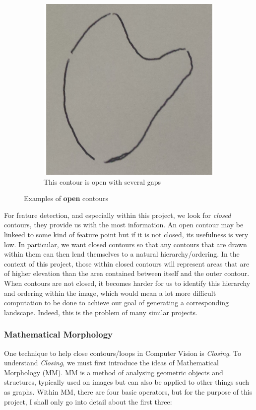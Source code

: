\documentclass[11pt]{report}
\begin{document}
\begin{figure}[!ht]
\begin{subfigure}[t]{.3\textwidth}
		\centering
		\includegraphics[scale=0.3]{pics/openloop3.png}
		\caption{This contour is open with several gaps}
	\end{subfigure}
	\caption{Examples of \textbf{open} contours}
	\label{fig:opencontours}
\end{figure}

For feature detection, and especially within this project, we look for 
\textit{closed} contours, they provide us with the most information. An open
contour may be linkeed to some kind of feature point but if it is not closed,
its usefulness is very low. In particular, we want closed contours so that any
contours that are drawn within them can then lend themselves to a natural
hierarchy/ordering. In the context of this project, those within closed contours
will represent areas that are of higher elevation than the area contained between
itself and the outer contour. When contours are not closed, it becomes harder
for us to identify this hierarchy and ordering within the image,
which would mean a lot more difficult computation to be done to achieve
our goal of generating a corresponding landscape. Indeed, this is the problem of
many similar projects.

\subsubsection*{Mathematical Morphology}
One technique to help close contours/loops in Computer Vision is \textit{Closing}.
To understand \textit{Closing}, we must first introduce the ideas of 
Mathematical Morphology (MM). MM is a method of analysing geometric objects
and structures, typically used on images but can also be applied to other things
such as graphs. Within MM, there are four basic operators, but for the purpose
of this project, I shall only go into detail about the first three:
\end{document}
